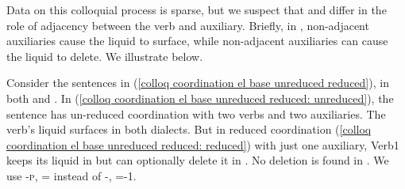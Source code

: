 

		Data on this colloquial process is sparse, but we suspect that {\seaCE} and {\iaIA} differ in the role of adjacency between the verb and auxiliary. Briefly, in {\iaIA}, non-adjacent auxiliaries cause the liquid to surface, while non-adjacent auxiliaries can cause the liquid to delete. We illustrate below. 

Consider the sentences in (\ref{colloq coordination el base unreduced reduced}), in both {\seaCE} and   {\iaIA}. In (\ref{colloq coordination el base unreduced reduced: unreduced}), the sentence has un-reduced coordination with two verbs and two auxiliaries. The verb's liquid surfaces in both dialects. But in   reduced coordination (\ref{colloq coordination el base unreduced reduced: reduced}) with just one auxiliary, Verb1 keeps its liquid in {\iaIA} but can optionally delete it in {\seaCEA}. No deletion is found in {\seaSE}. We use -\textsc{p}, ={\auxgloss} instead of -{\perfcvb}, ={\auxgloss}-1{\sg}.\largerpage[-2]

